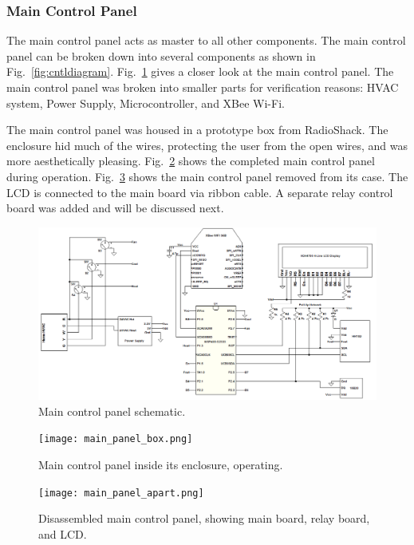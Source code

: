 \subsubsection{Main Control Panel}
The main control panel acts as master to all other components. The main control panel can be broken down into several components as shown in Fig.~\ref{fig:cntldiagram}. Fig.~\ref{fig:main_cntl_schematic} gives a closer look at the main control panel.  The main control panel was broken into smaller parts for verification reasons: HVAC system, Power Supply, Microcontroller, and XBee Wi-Fi.

The main control panel was housed in a prototype box from RadioShack.  The enclosure hid much of the wires, protecting the user from the open wires, and was more aesthetically pleasing. Fig.~\ref{fig:main_panel_box} shows the completed main control panel during operation.  Fig.~\ref{fig:main_panel_apart} shows the main control panel removed from its case.  The LCD is connected to the main board via ribbon cable.  A separate relay control board was added and will be discussed next.
\begin{figure}
\centering
\includegraphics[width=.99\textwidth]{main_cntl_schematic.png}
\caption{Main control panel schematic.}
\label{fig:main_cntl_schematic}
\end{figure}

\begin{figure}
\centering
\texttt{[image: main\_panel\_box.png]}
\caption{Main control panel inside its enclosure, operating.}
\label{fig:main_panel_box}
\end{figure}

\begin{figure}
\centering
\texttt{[image: main\_panel\_apart.png]}
\caption{Disassembled main control panel, showing main board, relay board, and LCD.}
\label{fig:main_panel_apart}
\end{figure}

